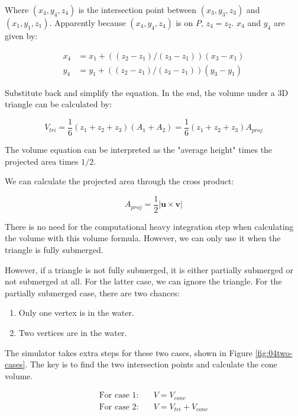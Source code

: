 Where $(x_4,y_4,z_4)$ is the intersection point between $(x_3,y_3,z_3)$ and $(x_1,y_1,z_1)$. Apparently because $(x_4, y_4, z_4)$ is on $P$, $z_4=z_2$. $x_4$ and $y_4$ are given by:

\begin{align}
    x_4 &= x_1 + ((z_2-z_1)/(z_3-z_1)) (x_3-x_1) \\
    y_4 &= y_1 + ((z_2-z_1)/(z_3-z_1)) (y_3-y_1)
\end{align}

Substitute back and simplify the equation. In the end, the volume under a 3D triangle can be calculated by:

\begin{equation}
    V_{tri}  =  \frac{1}{6}(z_1+z_2+z_3)(A_1+A_2)=\frac{1}{6}(z_1+z_2+z_3)A_{proj}
\end{equation}

The volume equation can be interpreted as the "average height" times the projected area times $1/2$.

We can calculate the projected area through the cross product:

\begin{equation}
    A_{proj}=\frac{1}{2}|\boldsymbol{u}\times\boldsymbol{v}|
\end{equation}

There is no need for the computational heavy integration step when calculating the volume with this volume formula. However, we can only use it when the triangle is fully submerged.

However, if a triangle is not fully submerged, it is either partially submerged or not submerged at all. For the latter case, we can ignore the triangle. For the partially submerged case, there are two chances:

\begin{enumerate}
    \item Only one vertex is in the water.
    \item Two vertices are in the water.
\end{enumerate}

The simulator takes extra steps for these two cases, shown in Figure \ref{fig:04two-cases}. The key is to find the two intersection points and calculate the cone volume.


\begin{align}
    \text{For case 1:} & \quad V=V_{cone} \\
    \text{For case 2:} & \quad V=V_{tri}+V_{cone}
\end{align}

